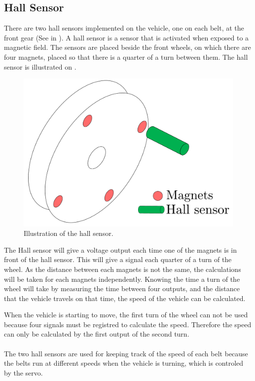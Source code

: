 \subsection{Hall Sensor}
There are two hall sensors implemented on the vehicle, one on each belt, at the front gear (See  in \secref{}). A hall sensor is a sensor that is activated when exposed to a magnetic field. The sensors are placed beside the front wheels, on which there are four magnets, placed so that there is a quarter of a turn between them. The hall sensor is illustrated on .

 \begin{figure}[H]
	\centering
	\includegraphics[scale=0.5]{figures/HallSensor3D.pdf}
	\caption{Illustration of the hall sensor.}
	\label{HallSensor}
\end{figure}

The Hall sensor will give a voltage output each time one of the magnets is in front of the hall sensor. This will give a signal each quarter of a turn of the wheel. As the distance between each magnets is not the same, the calculations will be taken for each magnets independently.
Knowing the time a turn of the wheel will take by measuring the time between four outputs, and the distance that the vehicle travels on that time, the speed of the vehicle can be calculated.

When the vehicle is starting to move, the first turn of the wheel can not be used because four signals must be registred to calculate the speed. Therefore the speed can only be calculated by the first output of the second turn.\\\\

The two hall sensors are used for keeping track of the speed of each belt because the belts run at different speeds when the vehicle is turning, which is controled by the servo.
